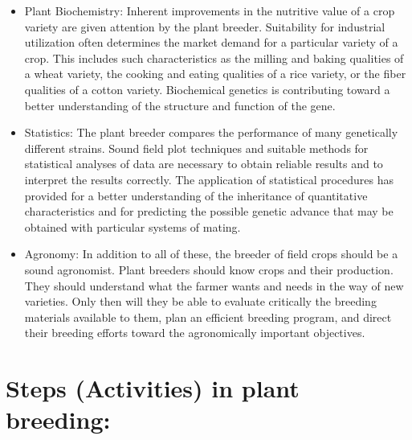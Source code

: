 \documentclass[11pt,ignorenonframetext,aspectratio=169]{beamer}
\providecommand{\tightlist}{%
  \setlength{\itemsep}{0pt}\setlength{\parskip}{0pt}}
\begin{document}
\begin{frame}{}
\protect\hypertarget{section-15}{}
\small

\begin{itemize}
\tightlist
\item
  Plant Biochemistry: Inherent improvements in the nutritive value of a
  crop variety are given attention by the plant breeder. Suitability for
  industrial utilization often determines the market demand for a
  particular variety of a crop. This includes such characteristics as
  the milling and baking qualities of a wheat variety, the cooking and
  eating qualities of a rice variety, or the fiber qualities of a cotton
  variety. Biochemical genetics is contributing toward a better
  understanding of the structure and function of the gene.
\item
  Statistics: The plant breeder compares the performance of many
  genetically different strains. Sound field plot techniques and
  suitable methods for statistical analyses of data are necessary to
  obtain reliable results and to interpret the results correctly. The
  application of statistical procedures has provided for a better
  understanding of the inheritance of quantitative characteristics and
  for predicting the possible genetic advance that may be obtained with
  particular systems of mating.
\item
  Agronomy: In addition to all of these, the breeder of field crops
  should be a sound agronomist. Plant breeders should know crops and
  their production. They should understand what the farmer wants and
  needs in the way of new varieties. Only then will they be able to
  evaluate critically the breeding materials available to them, plan an
  efficient breeding program, and direct their breeding efforts toward
  the agronomically important objectives.
\end{itemize}
\end{frame}

\hypertarget{steps-activities-in-plant-breeding}{%
\section{Steps (Activities) in plant
breeding:}\label{steps-activities-in-plant-breeding}}
\end{document}
